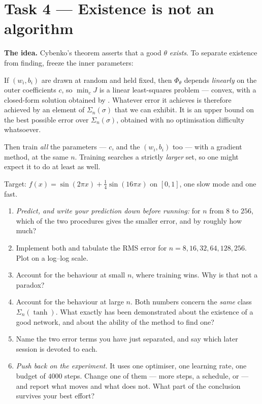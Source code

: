 \documentclass[11pt,a4paper]{article}
\begin{document}
\section{Task 4 --- Existence is not an algorithm}

\begin{plainbox}
\textbf{The idea.} Cybenko's theorem asserts that a good $\theta$ \emph{exists}. To separate
existence from finding, freeze the inner parameters:

\smallskip
If $(w_i,b_i)$ are drawn at random and held fixed, then $\Phi_\theta$ depends \emph{linearly} on the
outer coefficients $c$, so $\min_c J$ is a linear least-squares problem --- convex, with a closed-form
solution obtained by . Whatever error it achieves is therefore achieved by
an element of $\Sigma_n(\sigma)$ that we can exhibit. It is an upper bound on the best possible error
over $\Sigma_n(\sigma)$, obtained with no optimisation difficulty whatsoever.

\smallskip
Then train \emph{all} the parameters --- $c$, and the $(w_i,b_i)$ too --- with a gradient method, at
the same $n$. Training searches a strictly \emph{larger} set, so one might expect it to do at least
as well.
\end{plainbox}

\begin{task}\label{task:gap} \tagcore
Target: $f(x) = \sin(2\pi x) + \tfrac14\sin(16\pi x)$ on $[0,1]$, one slow mode and one fast.
\begin{enumerate}[label=\textbf{\arabic*.}]
\item \emph{Predict, and write your prediction down before running:} for $n$ from $8$ to $256$, which
of the two procedures gives the smaller error, and by roughly how much?
\item Implement both and tabulate the RMS error for $n = 8, 16, 32, 64, 128, 256$. Plot on a
log--log scale.
\item Account for the behaviour at small $n$, where training wins. Why is that not a paradox?
\item Account for the behaviour at large $n$. Both numbers concern the \emph{same} class
$\Sigma_n(\tanh)$. What exactly has been demonstrated about the existence of a good network, and
about the ability of the method to find one?
\item Name the two error terms you have just separated, and say which later session is devoted to
each.
\item \emph{Push back on the experiment.} It uses one optimiser, one learning rate, one budget of
$4000$ steps. Change one of them --- more steps, a schedule, or  --- and
report what moves and what does not. What part of the conclusion survives your best effort?
\end{enumerate}
\end{task}
\end{document}
